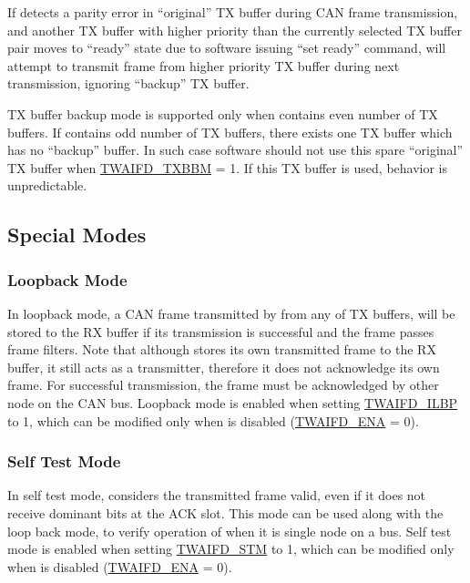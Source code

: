 \documentclass[main\_\_EN.tex]{subfiles}
\begin{document}
If \modulename{} detects a parity error in ``original'' TX buffer during CAN frame transmission, and another TX buffer with higher priority than the currently selected TX buffer pair moves to ``ready'' state due to software issuing ``set ready'' command, \modulename{} will attempt to transmit frame from higher priority TX buffer during next transmission, ignoring ``backup'' TX buffer.

TX buffer backup mode is supported only when \modulename{} contains even number of TX buffers. If \modulename{} contains odd number of TX buffers, there exists one TX buffer which has no ``backup'' buffer. In such case software should not use this spare ``original'' TX buffer when \hyperref[fielddesc:TWAIFDTXBBM]{TWAIFD\_TXBBM} = 1. If this TX buffer is used, \modulename{} behavior is unpredictable.



\subsection{Special Modes}

\subsubsection{Loopback Mode}

In loopback mode, a CAN frame transmitted by \modulename{} from any of TX buffers, will be stored to the RX buffer if its transmission is successful and the frame passes frame filters. Note that although \modulename{} stores its own transmitted frame to the RX buffer, it still acts as a transmitter, therefore it does not acknowledge its own frame. For successful transmission, the frame must be acknowledged by other node on the CAN bus. Loopback mode is enabled when setting \hyperref[fielddesc:TWAIFDILBP]{TWAIFD\_ILBP} to 1, which can be modified only when \modulename{} is disabled (\hyperref[fielddesc:TWAIFDENA]{TWAIFD\_ENA} = 0).

\subsubsection{Self Test Mode}

In self test mode, \modulename{} considers the transmitted frame valid, even if it does not receive dominant bits at the ACK slot. This mode can be used along with the loop back mode, to verify operation of \modulename{} when it is single node on a bus. Self test mode is enabled when setting \hyperref[fielddesc:TWAIFDSTM]{TWAIFD\_STM} to 1, which can be modified only when \modulename{} is disabled (\hyperref[fielddesc:TWAIFDENA]{TWAIFD\_ENA} = 0).
\end{document}
